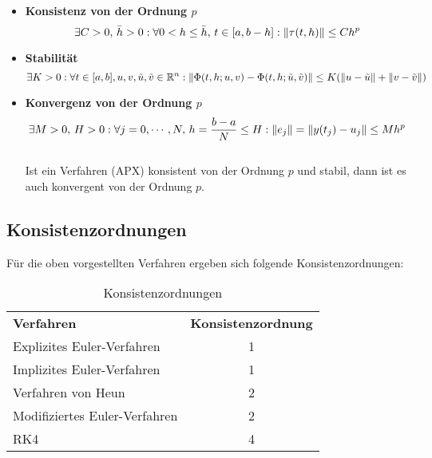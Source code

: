			\begin{itemize}
				\item \textbf{Konsistenz von der Ordnung \(p\)}
					\begin{equation*}
						\exists C > 0,\, \bar{h} > 0 : \forall 0 < h \leq \bar{h},\, t \in [a, b - h] : \norm{\tau(t, h)} \leq C h^p
					\end{equation*}
				\item \textbf{Stabilität}
					\begin{equation*}
						\exists K > 0 : \forall t \in [a, b], u, v, \tilde{u}, \tilde{v} \in \mathbb{R}^n : \norm{\Phi(t, h; u, v) - \Phi(t, h; \tilde{u}, \tilde{v})} \leq K (\norm{u - \tilde{u}} + \norm{v - \tilde{v}})
					\end{equation*}
				\item \textbf{Konvergenz von der Ordnung \(p\)}
					\begin{equation*}
						\exists M > 0,\, H > 0 : \forall j = 0, \cdots, N,\, h = \frac{b-a}{N} \leq H : \norm{e_j} = \norm{y(t_j) - u_j} \leq M h^p
					\end{equation*} \\ Ist ein Verfahren (APX) konsistent von der Ordnung \(p\) und stabil, dann ist es auch konvergent von der Ordnung \(p\).
			\end{itemize}

			\subsection{Konsistenzordnungen}
				Für die oben vorgestellten Verfahren ergeben sich folgende Konsistenzordnungen:
				\begin{table}[H]
					\centering
					\begin{tabular}{l c}
						\textbf{Verfahren}            & \textbf{Konsistenzordnung} \\
						Explizites Euler-Verfahren    & 1                          \\
						Implizites Euler-Verfahren    & 1                          \\
						Verfahren von Heun            & 2                          \\
						Modifiziertes Euler-Verfahren & 2                          \\
						RK4                           & 4
					\end{tabular}
					\caption{Konsistenzordnungen}
					\label{tab:consistency}
				\end{table}

